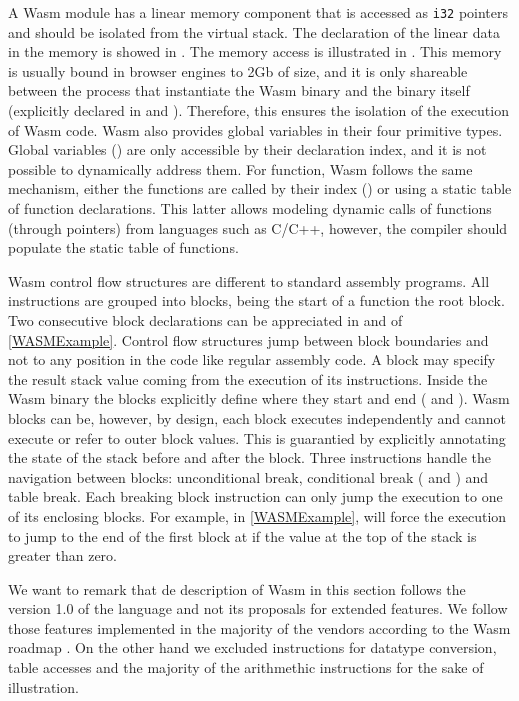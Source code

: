 A Wasm module has a linear memory component that is accessed as \texttt{i32} pointers and should be isolated from the virtual stack. The declaration of the linear data in the memory is showed in . The memory access is illustrated in . This memory is usually bound in browser engines to 2Gb of size, and it is only shareable between the process that instantiate the Wasm binary and the binary itself (explicitly declared in  and ). Therefore, this ensures the isolation of the execution of Wasm code. Wasm also provides global variables in their four primitive types. Global variables () are only accessible by their declaration index, and it is not possible to dynamically address them. For function, Wasm follows the same mechanism, either the functions are called by their index () or using a static table of function declarations. This latter allows modeling dynamic calls of functions (through pointers) from languages such as C/C++, however, the compiler should populate the static table of functions.


Wasm control flow structures are different to standard assembly programs. All instructions are grouped into blocks, being the start of a function the root block. Two consecutive block declarations can be appreciated in  and  of \autoref{WASMExample}. Control flow structures jump between block boundaries and not to any position in the code like regular assembly code. A block may specify the result stack value coming from the execution of its instructions. Inside the Wasm binary the blocks explicitly define where they start and end ( and ). Wasm blocks can be, however, by design, each block executes independently and cannot execute or refer to outer block values. This is guarantied by explicitly annotating the state of the stack before and after the block. Three instructions handle the navigation between blocks: unconditional break, conditional break ( and ) and table break. Each breaking block instruction can only jump the execution to one of its enclosing blocks. For example, in \autoref{WASMExample},  will force the execution to jump to the end of the first block at  if the value at the top of the stack is greater than zero.

We want to remark that de description of Wasm in this section follows the version 1.0 of the language and not its proposals for extended features. We follow those features implemented in the majority of the vendors according to the Wasm roadmap \cite{wasm_roadmap}. On the other hand we excluded instructions for datatype conversion, table accesses and the majority of the arithmethic instructions for the sake of illustration.

